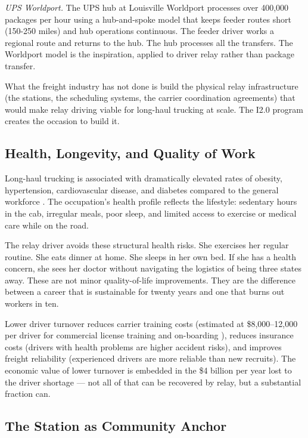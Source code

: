 \textit{UPS Worldport.} The UPS hub at Louisville Worldport processes over 400,000
packages per hour using a hub-and-spoke model that keeps feeder routes short (150-250 miles)
and hub operations continuous. The feeder driver works a regional route and returns to the
hub. The hub processes all the transfers. The Worldport model is the inspiration, applied
to driver relay rather than package transfer.

What the freight industry has not done is build the physical relay infrastructure
(the stations, the scheduling systems, the carrier coordination agreements) that would
make relay driving viable for long-haul trucking at scale. The I2.0 program creates
the occasion to build it.

\subsection{Health, Longevity, and Quality of Work}

Long-haul trucking is associated with dramatically elevated rates of obesity, hypertension,
cardiovascular disease, and diabetes compared to the general workforce \citep{BLS_trucking2023}.
The occupation's health profile reflects the lifestyle: sedentary hours in the cab,
irregular meals, poor sleep, and limited access to exercise or medical care while on the road.

The relay driver avoids these structural health risks. She exercises her regular routine.
She eats dinner at home. She sleeps in her own bed. If she has a health concern, she
sees her doctor without navigating the logistics of being three states away.
These are not minor quality-of-life improvements. They are the difference between
a career that is sustainable for twenty years and one that burns out workers in ten.

Lower driver turnover reduces carrier training costs (estimated at \$8,000--12,000 per
driver for commercial license training and on-boarding \citep{ATRI_shortage2024}),
reduces insurance costs (drivers with health problems are higher accident risks),
and improves freight reliability (experienced drivers are more reliable than new recruits).
The economic value of lower turnover is embedded in the \$4 billion per year lost to
the driver shortage --- not all of that can be recovered by relay, but a substantial
fraction can.

\subsection{The Station as Community Anchor}

